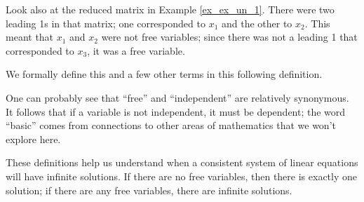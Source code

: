 Look also at the reduced matrix in Example \ref{ex_ex_un_1}. There were two leading 1s in that matrix; one corresponded to $x_1$ and the other to $x_2$. This meant that $x_1$ and $x_2$ were not free variables; since there was not a leading 1 that corresponded to $x_3$, it was a free variable. 

We formally define this and a few other terms in this following definition.


One can probably see that ``free'' and ``independent'' are relatively synonymous. It follows that if a variable is not independent, it must be dependent; the word ``basic'' comes from connections to other areas of mathematics that we won't explore here.




These definitions help us understand when a consistent system of linear equations will have infinite solutions. If there are no free variables, then there is exactly one solution; if there are any free variables, there are infinite solutions. 

